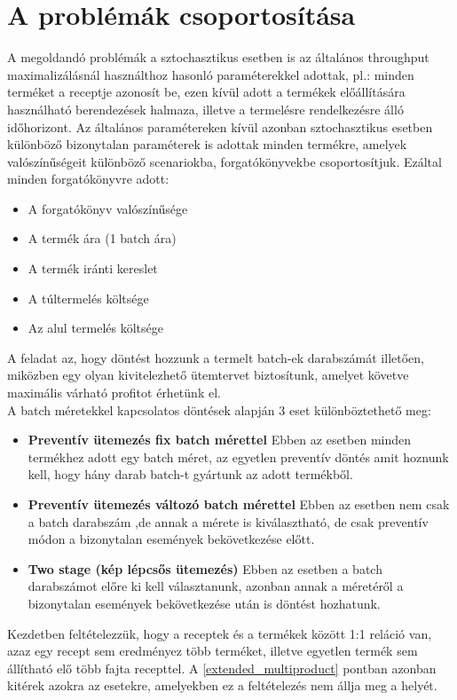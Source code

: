 \documentclass [12pt]{report}
\begin{document}
\section{A problémák csoportosítása} \label{problem_csop}
A megoldandó problémák a sztochasztikus esetben is az általános throughput maximalizálásnál használthoz hasonló paraméterekkel adottak, pl.: minden terméket a receptje azonosít be, ezen kívül adott a termékek előállítására használható berendezések halmaza, illetve a termelésre rendelkezésre álló időhorizont. Az általános paramétereken kívül azonban sztochasztikus esetben különböző bizonytalan paraméterek is adottak minden termékre, amelyek valószínűségeit különböző scenariokba, forgatókönyvekbe csoportosítjuk. Ezáltal minden forgatókönyvre adott: 
\begin{itemize}
\item{A forgatókönyv valószínűsége}
\item{A termék ára (1 batch ára)}
\item{A termék iránti kereslet}
\item{A túltermelés költsége}
\item{Az alul termelés költsége}
\end{itemize}
A feladat az, hogy döntést hozzunk a termelt batch-ek darabszámát illetően, miközben egy olyan kivitelezhető ütemtervet biztosítunk, amelyet követve maximális várható profitot érhetünk el.\\
A batch méretekkel kapcsolatos döntések alapján 3 eset különböztethető meg:
\begin{itemize}
\item \textbf{Preventív ütemezés fix batch mérettel} Ebben az esetben minden termékhez adott egy batch méret, az egyetlen preventív döntés amit hoznunk kell, hogy hány darab batch-t gyártunk az adott termékből.
\item \textbf{Preventív ütemezés változó batch mérettel} Ebben az esetben nem csak a batch darabszám ,de annak a mérete is kiválasztható, de csak preventív módon a bizonytalan események bekövetkezése előtt.
\item \textbf{Two stage (kép lépcsős ütemezés)} Ebben az esetben a batch darabszámot előre ki kell választanunk, azonban annak a méretéről a bizonytalan események bekövetkezése után is döntést hozhatunk.
\end{itemize}
Kezdetben feltételezzük, hogy a receptek és a termékek között 1:1 reláció van, azaz egy recept sem eredményez több terméket, illetve egyetlen termék sem állítható elő több fajta recepttel. A \ref{extended_multiproduct} pontban azonban kitérek azokra az esetekre, amelyekben ez a feltételezés nem állja meg a helyét.
\pagebreak
\end{document}
